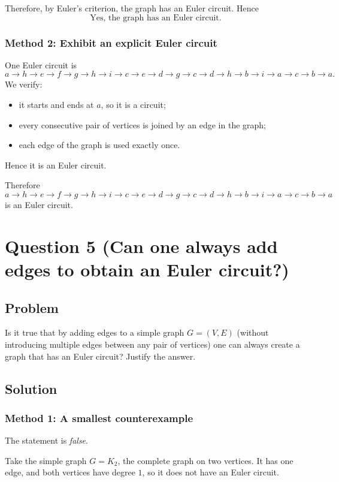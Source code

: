 \documentclass[12pt]{article}
\begin{document}
Therefore, by Euler's criterion, the graph has an Euler circuit. Hence
\[
\boxed{\text{Yes, the graph has an Euler circuit.}}
\]

\subsubsection{Method 2: Exhibit an explicit Euler circuit}
One Euler circuit is
\[
a\to h\to e\to f\to g\to h\to i\to c\to e\to d\to g\to c\to d\to h\to b\to i\to a\to c\to b\to a.
\]
We verify:
\begin{itemize}[leftmargin=*]
  \item it starts and ends at \(a\), so it is a circuit;
  \item every consecutive pair of vertices is joined by an edge in the graph;
  \item each edge of the graph is used exactly once.
\end{itemize}
Hence it is an Euler circuit.

Therefore
\[
\boxed{a\to h\to e\to f\to g\to h\to i\to c\to e\to d\to g\to c\to d\to h\to b\to i\to a\to c\to b\to a}
\]
is an Euler circuit.

\newpage

\section{Question 5 (Can one always add edges to obtain an Euler circuit?)}

\subsection{Problem}
Is it true that by adding edges to a simple graph \(G=(V,E)\) (without introducing multiple edges between any pair of vertices) one can always create a graph that has an Euler circuit? Justify the answer.

\subsection{Solution}

\subsubsection{Method 1: A smallest counterexample}
The statement is \emph{false}.

Take the simple graph \(G=K_2\), the complete graph on two vertices. It has one edge, and both vertices have degree \(1\), so it does not have an Euler circuit.
\end{document}
